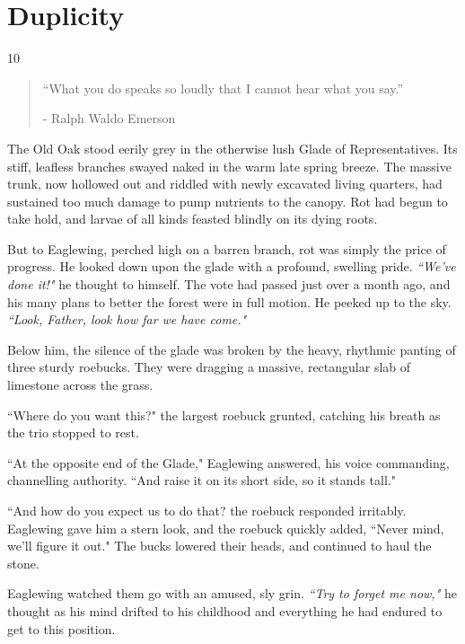 \chapter{Duplicity} %

\vspace{-1.3cm}
\begin{localsize}{10}
    \begin{quote}
        “What you do speaks so loudly that I cannot hear what you say.”
        \begin{flushright}- Ralph Waldo Emerson \end{flushright}
    \end{quote}
\end{localsize}
\vspace{1cm}


The Old Oak stood eerily grey in the otherwise lush Glade of Representatives.
Its stiff, leafless branches swayed naked in the warm late spring breeze.
The massive trunk, now hollowed out and riddled with newly excavated living quarters, had sustained too much damage to pump nutrients to the canopy.
Rot had begun to take hold, and larvae of all kinds feasted blindly on its dying roots.

But to Eaglewing, perched high on a barren branch, rot was simply the price of progress.
He looked down upon the glade with a profound, swelling pride. \textit{``We've done it!"} he thought to himself.
The vote had passed just over a month ago, and his many plans to better the forest were in full motion.
He peeked up to the sky. \textit{``Look, Father, look how far we have come."}

Below him, the silence of the glade was broken by the heavy, rhythmic panting of three sturdy roebucks.
They were dragging a massive, rectangular slab of limestone across the grass.

``Where do you want this?" the largest roebuck grunted, catching his breath as the trio stopped to rest.

``At the opposite end of the Glade," Eaglewing answered, his voice commanding, channelling authority.
``And raise it on its short side, so it stands tall."

``And how do you expect us to do that?
the roebuck responded irritably.
Eaglewing gave him a stern look, and the roebuck quickly added, ``Never mind, we'll figure it out."
The bucks lowered their heads, and continued to haul the stone.

Eaglewing watched them go with an amused, sly grin. \textit{``Try to forget me now,"} he thought as his mind drifted to his childhood and everything he had endured to get to this position.\\

